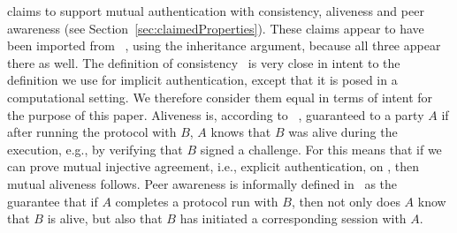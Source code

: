 

\mEdhoc{} claims to support mutual authentication with consistency, aliveness
and peer awareness (see Section~\ref{sec:claimedProperties}).
%
These claims appear to have been imported from \mSigma{}~\cite{sigma}, using the
inheritance argument, because all three appear there as well.
%
The definition of consistency~\cite{sigma} is very close in intent to the
definition we use for implicit authentication, except that it is posed in a
computational setting.
%
We therefore consider them equal in terms of intent for the purpose of this
paper.
%
Aliveness is, according to \mSigma{}~\cite{sigma}, guaranteed to a party $A$ if
after running the protocol with $B$, $A$ knows that $B$ was alive during
the execution, e.g., by verifying that $B$ signed a challenge.
%
For \mEdhoc{} this means that if we can prove mutual injective agreement, i.e.,
explicit authentication, on \mGxy{}, then mutual aliveness follows.
%
Peer awareness is informally defined in~\cite{sigma} as the guarantee
that if $A$ completes a protocol run with $B$, then not only does $A$
know that $B$ is alive, but also that $B$ has initiated a corresponding session
with $A$.
\\


